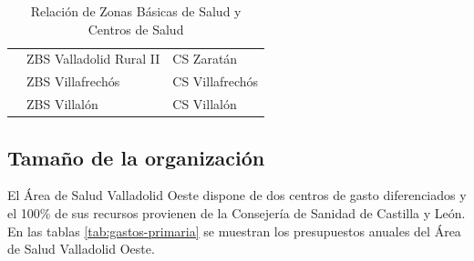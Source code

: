 \begin{table}[H]
\begin{tabular}{cll}
                                                   & ZBS Valladolid Rural II & CS Zaratán                 \\
                                                   & ZBS Villafrechós        & CS Villafrechós            \\
                                                   & ZBS Villalón            & CS Villalón                \\
        \bottomrule
    \end{tabular}
    \caption{Relación de Zonas Básicas de Salud y Centros de Salud}
    \label{tab:zonas-basicas}
\end{table}

\subsection{Tamaño de la organización}

El Área de Salud Valladolid Oeste dispone de dos centros de gasto diferenciados y el 100\% de sus recursos provienen de la Consejería de Sanidad de Castilla y León. En las tablas \ref{tab:gastos-primaria} se muestran los presupuestos anuales del Área de Salud Valladolid Oeste.

